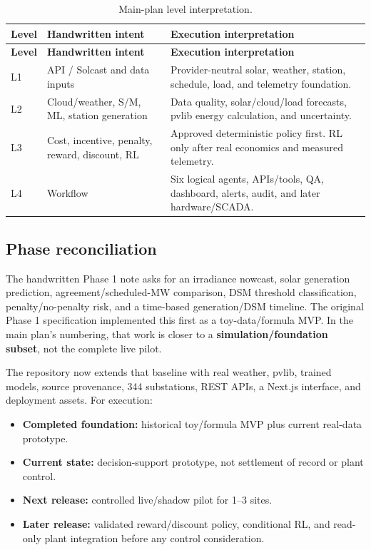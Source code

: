 \documentclass[11pt,a4paper]{article}
\begin{document}
\begin{longtable}{@{}p{1.0cm}p{4.1cm}p{9.4cm}@{}}
\caption{Main-plan level interpretation.}\label{tab:levels}\\
\toprule
\textbf{Level} & \textbf{Handwritten intent} & \textbf{Execution interpretation}\\
\midrule
\endfirsthead
\toprule
\textbf{Level} & \textbf{Handwritten intent} & \textbf{Execution interpretation}\\
\midrule
\endhead
\bottomrule
\endfoot
L1 & API / Solcast and data inputs &
Provider-neutral solar, weather, station, schedule, load, and telemetry foundation.\\
L2 & Cloud/weather, S/M, ML, station generation &
Data quality, solar/cloud/load forecasts, pvlib energy calculation, and uncertainty.\\
L3 & Cost, incentive, penalty, reward, discount, RL &
Approved deterministic policy first. RL only after real economics and measured telemetry.\\
L4 & Workflow &
Six logical agents, APIs/tools, QA, dashboard, alerts, audit, and later hardware/SCADA.\\
\end{longtable}

\subsection{Phase reconciliation}

The handwritten Phase 1 note asks for an irradiance nowcast, solar generation prediction,
agreement/scheduled-MW comparison, DSM threshold classification, penalty/no-penalty risk,
and a time-based generation/DSM timeline. The original Phase 1 specification implemented this
first as a toy-data/formula MVP. In the main plan's numbering, that work is closer to a
\textbf{simulation/foundation subset}, not the complete live pilot.

The repository now extends that baseline with real weather, pvlib, trained models, source
provenance, 344 substations, REST APIs, a Next.js interface, and deployment assets. For execution:

\begin{itemize}
  \item \textbf{Completed foundation:} historical toy/formula MVP plus current real-data prototype.
  \item \textbf{Current state:} decision-support prototype, not settlement of record or plant control.
  \item \textbf{Next release:} controlled live/shadow pilot for 1--3 sites.
  \item \textbf{Later release:} validated reward/discount policy, conditional RL, and read-only
        plant integration before any control consideration.
\end{itemize}
\end{document}
